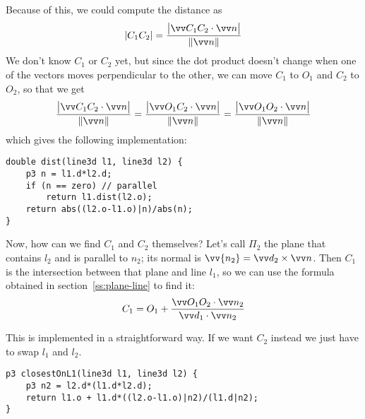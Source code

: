 
Because of this, we could compute the distance as
\[|C_1C_2| = \frac{\big|\dotv{C_1C_2}{n}\big|}{\normv{n}}\]
We don't know $C_1$ or $C_2$ yet, but since the dot product doesn't change when one of the vectors moves perpendicular to the other, we can move $C_1$ to $O_1$ and $C_2$ to $O_2$, so that we get
\[\frac{\big|\dotv{C_1C_2}{n}\big|}{\normv{n}} = \frac{\big|\dotv{O_1C_2}{n}\big|}{\normv{n}} = \frac{\big|\dotv{O_1O_2}{n}\big|}{\normv{n}}\]
which gives the following implementation:
\begin{lstlisting}
double dist(line3d l1, line3d l2) {
    p3 n = l1.d*l2.d;
    if (n == zero) // parallel
        return l1.dist(l2.o);
    return abs((l2.o-l1.o)|n)/abs(n);
}
\end{lstlisting}

Now, how can we find $C_1$ and $C_2$ themselves? Let's call $\Pi_2$ the plane that contains $l_2$ and is parallel to $n_2$; its normal is $\vv{n_2} = \crossv{d_2}{n}$. Then $C_1$ is the intersection between that plane and line $l_1$, so we can use the formula obtained in section~\ref{ss:plane-line} to find it:
\[C_1 = O_1 + \frac{\dotv{O_1O_2}{n_2}}{\dotv{d_1}{n_2}}\]


This is implemented in a straightforward way. If we want $C_2$ instead we just have to swap $l_1$ and $l_2$.
\begin{lstlisting}
p3 closestOnL1(line3d l1, line3d l2) {
    p3 n2 = l2.d*(l1.d*l2.d);
    return l1.o + l1.d*((l2.o-l1.o)|n2)/(l1.d|n2);
}
\end{lstlisting}
